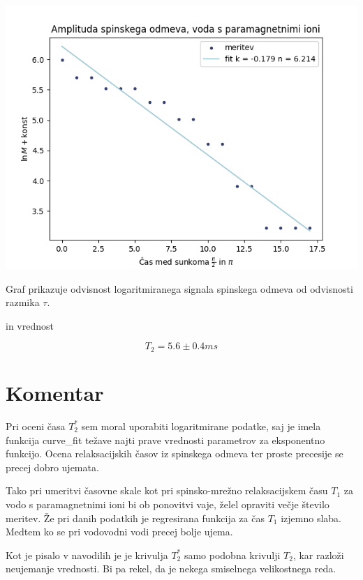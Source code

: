 \documentclass[11pt]{article}
\begin{document}
\begin{slika}[H]
\begin{center}
\includegraphics[width=.9\linewidth]{figures/spinski_odmev_t2.png}
\caption{\small Graf prikazuje odvisnost logaritmiranega signala spinskega odmeva od odvisnosti razmika \(  \tau \). }\label{fig:spinski_t2}
\end{center}
\end{slika}

in vrednost

\[ T_2 = 5.6 \pm 0.4 ms
\]
\section{Komentar}\label{sec:org50e2e3d}

Pri oceni časa \(T_2^{*}\) sem moral uporabiti logaritmirane podatke, saj je imela funkcija curve\_fit težave najti prave vrednosti parametrov za eksponentno funkcijo. Ocena relaksacijskih časov iz spinskega odmeva ter proste precesije se precej dobro ujemata.

Tako pri umeritvi časovne skale kot pri spinsko-mrežno relaksacijskem času \(T_1\) za vodo s paramagnetnimi ioni bi ob ponovitvi vaje, želel opraviti večje število meritev. Že pri danih podatkih je regresirana funkcija za čas \(T_1\) izjemno slaba. Medtem ko se pri vodovodni vodi precej bolje ujema.

Kot je pisalo v navodilih je je krivulja \(T_2^{*}\) samo podobna krivulji \(T_2\), kar razloži neujemanje vrednosti. Bi pa rekel, da je nekega smiselnega velikostnega reda.
\printbibliography[heading=bibintoc]
\end{document}
